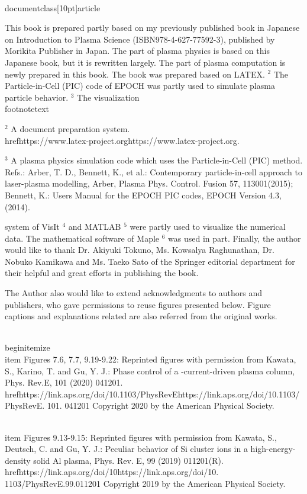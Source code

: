 \\documentclass[10pt]{article}
\begin{document}
This book is prepared partly based on my previously published book in Japanese on Introduction to Plasma Science (ISBN978-4-627-77592-3), published by Morikita Publisher in Japan. The part of plasma physics is based on this Japanese book, but it is rewritten largely. The part of plasma computation is newly prepared in this book. The book was prepared based on LATEX. ${ }^{2}$ The Particle-in-Cell (PIC) code of EPOCH was partly used to simulate plasma particle behavior. ${ }^{3}$ The visualization
\\footnotetext{${ }^{2}$ A document preparation system. \\href{https://www.latex-project.org}{https://www.latex-project.org}.

${ }^{3}$ A plasma physics simulation code which uses the Particle-in-Cell (PIC) method. Refs.: Arber, T. D., Bennett, K., et al.: Contemporary particle-in-cell approach to laser-plasma modelling, Arber, Plasma Phys. Control. Fusion 57, 113001(2015); Bennett, K.: Users Manual for the EPOCH PIC codes, EPOCH Version 4.3, (2014).
}
system of VisIt ${ }^{4}$ and MATLAB ${ }^{5}$ were partly used to visualize the numerical data. The mathematical software of Maple ${ }^{6}$ was used in part. Finally, the author would like to thank Dr. Akiyuki Tokuno, Ms. Kowsalya Raghunathan, Dr. Nobuko Kamikawa and Ms. Taeko Sato of the Springer editorial department for their helpful and great efforts in publishing the book.

The Author also would like to extend acknowledgments to authors and publishers, who gave permissions to reuse figures presented below. Figure captions and explanations related are also referred from the original works.

\\begin{itemize}
  \\item Figures 7.6, 7.7, 9.19-9.22: Reprinted figures with permission from Kawata, S., Karino, T. and Gu, Y. J.: Phase control of a -current-driven plasma column, Phys. Rev.E, 101 (2020) 041201. \\href{https://link.aps.org/doi/10.1103/PhysRevE}{https://link.aps.org/doi/10.1103/PhysRevE}. 101. 041201 Copyright 2020 by the American Physical Society.

  \\item Figures 9.13-9.15: Reprinted figures with permission from Kawata, S., Deutsch, C. and Gu, Y. J.: Peculiar behavior of Si cluster ions in a high-energy-density solid Al plasma, Phys. Rev. E, 99 (2019) 011201(R). \\href{https://link.aps.org/doi/10}{https://link.aps.org/doi/10}. 1103/PhysRevE.99.011201 Copyright 2019 by the American Physical Society.
\end{document}

